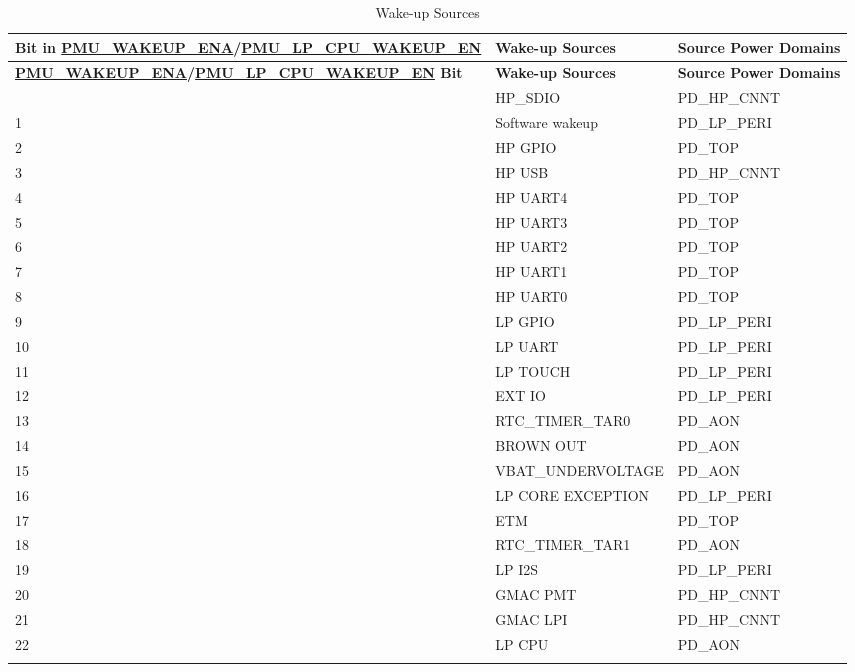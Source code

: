 \documentclass[main\_\_EN.tex]{subfiles}
\begin{document}
\begin{longtable}{ | l | l | l | }
\caption{Wake-up Sources}
\label{tab:lowpowm-wakeup-source}
\\\hline
\rowcolor{lightgray}
\textbf{Bit in \hyperref[fielddesc:PMUWAKEUPENA]{PMU\_WAKEUP\_ENA}/\hyperref[fielddesc:PMULPCPUWAKEUPEN]{PMU\_LP\_CPU\_WAKEUP\_EN}} & \textbf{Wake-up Sources} &  \textbf{Source Power Domains}   \\\hline
\endfirsthead
\hline\rowcolor{lightgray}
\textbf{\hyperref[fielddesc:PMUWAKEUPENA]{PMU\_WAKEUP\_ENA}/\hyperref[fielddesc:PMULPCPUWAKEUPEN]{PMU\_LP\_CPU\_WAKEUP\_EN} Bit} & \textbf{Wake-up Sources} &  \textbf{Source Power Domains}    \\\hline
\endhead
\endfoot
\iftagged{ESP32-P4-latest}{
    0 & HP\_SDIO & PD\_HP\_CNNT  \\\hline
    1 & Software wakeup & PD\_LP\_PERI \\\hline
    2 & HP GPIO   & PD\_TOP  \\\hline
    3 & HP USB  & PD\_HP\_CNNT  \\\hline
    4 & HP UART4 & PD\_TOP \\\hline
    5 & HP UART3 & PD\_TOP  \\\hline
    6 & HP UART2 & PD\_TOP  \\\hline
    7 & HP UART1 & PD\_TOP  \\\hline
    8 & HP UART0 & PD\_TOP  \\\hline
    9 & LP GPIO & PD\_LP\_PERI \\\hline
    10 & LP UART & PD\_LP\_PERI  \\\hline
    11 & LP TOUCH & PD\_LP\_PERI  \\\hline
    12 & EXT IO & PD\_LP\_PERI  \\\hline
    13 & RTC\_TIMER\_TAR0 & PD\_AON  \\\hline
    14 & BROWN OUT & PD\_AON  \\\hline
    15 & VBAT\_UNDERVOLTAGE & PD\_AON  \\\hline
    16 & LP CORE EXCEPTION & PD\_LP\_PERI  \\\hline
    17 & ETM & PD\_TOP  \\\hline
    18 & RTC\_TIMER\_TAR1 & PD\_AON  \\\hline
    19 & LP I2S & PD\_LP\_PERI  \\\hline
    20 & GMAC PMT & PD\_HP\_CNNT  \\\hline
    21 & GMAC LPI & PD\_HP\_CNNT  \\\hline
    22 & LP CPU & PD\_AON  \\\hline
}
\end{longtable}
\end{document}
